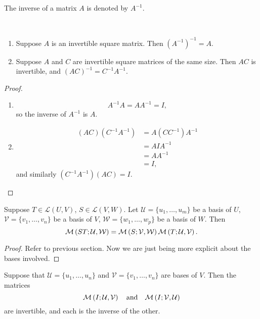 \begin{notation}
The inverse of a matrix $A$ is denoted by $A^{-1}$.
\end{notation}

\begin{proposition} \
\begin{enumerate}[label=(\roman*)]
\item Suppose $A$ is an invertible square matrix. Then $(A^{-1})^{-1}=A$.
\item Suppose $A$ and $C$ are invertible square matrices of the same size. Then $AC$ is invertible, and $(AC)^{-1}=C^{-1}A^{-1}$.
\end{enumerate}
\end{proposition}

\begin{proof} \
\begin{enumerate}[label=(\roman*)]
\item \[A^{-1}A=AA^{-1}=I,\]
so the inverse of $A^{-1}$ is $A$.
\item \begin{align*}
(AC)(C^{-1}A^{-1})
&=A(CC^{-1})A^{-1}\\
&=AIA^{-1}\\
&=AA^{-1}\\
&=I,
\end{align*}
and similarly $(C^{-1}A^{-1})(AC)=I$.
\end{enumerate}
\end{proof}

\begin{proposition}
Suppose $T\in\mathcal{L}(U,V)$, $S\in\mathcal{L}(V,W)$. Let $\mathcal{U}=\{u_1,\dots,u_m\}$ be a basis of $U$, $\mathcal{V}=\{v_1,\dots,v_n\}$ be a basis of $V$, $\mathcal{W}=\{w_1,\dots,w_p\}$ be a basis of $W$. Then
\[\mathcal{M}\left(ST;\mathcal{U},\mathcal{W}\right)=\mathcal{M}\left(S;\mathcal{V},\mathcal{W}\right)\mathcal{M}\left(T;\mathcal{U},\mathcal{V}\right).\]
\end{proposition}

\begin{proof}
Refer to previous section. Now we are just being more explicit about the bases involved.
\end{proof}

\begin{corollary}
Suppose that $\mathcal{U}=\{u_1,\dots,u_n\}$ and $\mathcal{V}=\{v_1,\dots,v_n\}$ are bases of $V$. Then the matrices
\[\mathcal{M}\left(I;\mathcal{U},\mathcal{V}\right)\quad\text{and}\quad\mathcal{M}\left(I;\mathcal{V},\mathcal{U}\right)\]
are invertible, and each is the inverse of the other.
\end{corollary}

